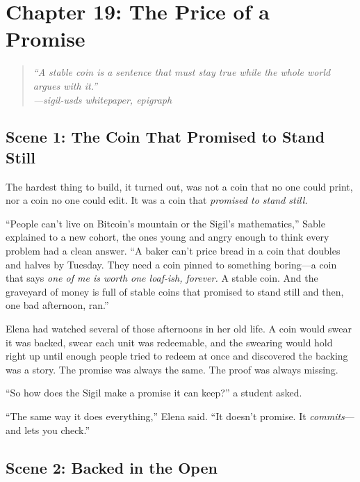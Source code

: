 \hypertarget{chapter-19-the-price-of-a-promise}{%
\section{Chapter 19: The Price of a
Promise}\label{chapter-19-the-price-of-a-promise}}

\begin{quote}
\itshape ``A stable coin is a sentence that must stay true while the whole world
argues with it.''\\
\normalfont\hfill---sigil-usds whitepaper, epigraph
\end{quote}

\hypertarget{scene-1-the-coin-that-promised-to-stand-still}{%
\subsection{Scene 1: The Coin That Promised to Stand
Still}\label{scene-1-the-coin-that-promised-to-stand-still}}

The hardest thing to build, it turned out, was not a coin that no one could print,
nor a coin no one could edit. It was a coin that \emph{promised to stand still.}

``People can't live on Bitcoin's mountain or the Sigil's mathematics,'' Sable
explained to a new cohort, the ones young and angry enough to think every problem
had a clean answer. ``A baker can't price bread in a coin that doubles and halves
by Tuesday. They need a coin pinned to something boring---a coin that says
\emph{one of me is worth one loaf-ish, forever.} A stable coin. And the graveyard
of money is full of stable coins that promised to stand still and then, one bad
afternoon, ran.''

Elena had watched several of those afternoons in her old life. A coin would swear
it was backed, swear each unit was redeemable, and the swearing would hold right up
until enough people tried to redeem at once and discovered the backing was a story.
The promise was always the same. The proof was always missing.

``So how does the Sigil make a promise it can keep?'' a student asked.

``The same way it does everything,'' Elena said. ``It doesn't promise. It
\emph{commits}---and lets you check.''

\hypertarget{scene-2-backed-in-the-open}{%
\subsection{Scene 2: Backed in the
Open}\label{scene-2-backed-in-the-open}}


